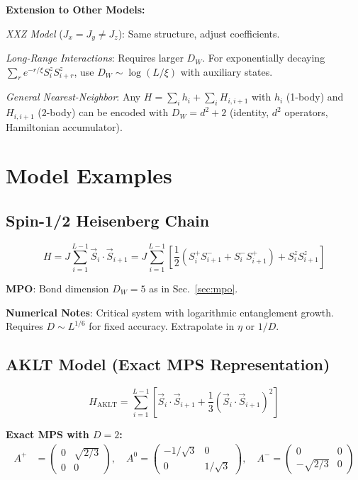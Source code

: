 \documentclass[aps,prb,onecolumn,scriptaddress]{revtex4-2}
\begin{document}
	\textbf{Extension to Other Models:}
	
	\textit{XXZ Model} ($J_x = J_y \neq J_z$): Same structure, adjust coefficients.
	
	\textit{Long-Range Interactions}: Requires larger $D_W$. For exponentially decaying $\sum_{r} e^{-r/\xi} S_i^z S_{i+r}^z$, use $D_W \sim \log(L/\xi)$ with auxiliary states.
	
	\textit{General Nearest-Neighbor}: Any $H = \sum_i h_i + \sum_i H_{i,i+1}$ with $h_i$ (1-body) and $H_{i,i+1}$ (2-body) can be encoded with $D_W = d^2 + 2$ (identity, $d^2$ operators, Hamiltonian accumulator).
	
	\section{Model Examples}
	
	\subsection{Spin-1/2 Heisenberg Chain}
	\begin{equation}
		H = J \sum_{i=1}^{L-1} \vec{S}_i \cdot \vec{S}_{i+1} = J \sum_{i=1}^{L-1} \left[ \frac{1}{2}\left(S_i^+ S_{i+1}^- + S_i^- S_{i+1}^+\right) + S_i^z S_{i+1}^z \right]
	\end{equation}
	
	\textbf{MPO}: Bond dimension $D_W=5$ as in Sec.~\ref{sec:mpo}.
	
	\textbf{Numerical Notes}: Critical system with logarithmic entanglement growth. Requires $D \sim L^{1/6}$ for fixed accuracy. Extrapolate in $\eta$ or $1/D$.
	
	\subsection{AKLT Model (Exact MPS Representation)}
	\begin{equation}
		H_{\text{AKLT}} = \sum_{i=1}^{L-1} \left[ \vec{S}_i \cdot \vec{S}_{i+1} + \frac{1}{3} (\vec{S}_i \cdot \vec{S}_{i+1})^2 \right]
	\end{equation}
	
	\textbf{Exact MPS with $D=2$:}
	\begin{align}
		A^{+} &= \begin{pmatrix} 0 & \sqrt{2/3} \\ 0 & 0 \end{pmatrix}, \quad
		A^{0} = \begin{pmatrix} -1/\sqrt{3} & 0 \\ 0 & 1/\sqrt{3} \end{pmatrix}, \quad
		A^{-} = \begin{pmatrix} 0 & 0 \\ -\sqrt{2/3} & 0 \end{pmatrix}
	\end{align}
	
\end{document}

